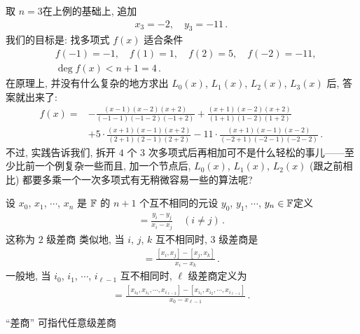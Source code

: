 \begin{example}
    取 $n = 3$\period 在上例的基础上, 追加
    \begin{align*}
        x_3 = -2, \quad y_3 = -11 \period
    \end{align*}
    我们的目标是: 找多项式 $f(x)$ 适合条件
    \begin{align*}
         & f(-1) = -1, \quad f(1) = 1, \quad f(2) = 5, \quad f(-2) = -11, \\
         & \deg f(x) < n + 1 = 4 \period
    \end{align*}
    在原理上, 并没有什么复杂的地方\period 求出 $L_0 (x)$, $L_1 (x)$, $L_2 (x)$, $L_3 (x)$ 后, 答案就出来了:
    \begin{align*}
        f(x)
        = {} & - \frac{(x-1)(x-2)(x+2)}{(-1-1)(-1-2)(-1+2)} + \frac{(x+1)(x-2)(x+2)}{(1+1)(1-2)(1+2)}                          \\
             & + 5 \cdot \frac{(x+1)(x-1)(x+2)}{(2+1)(2-1)(2+2)} - 11 \cdot \frac{(x+1)(x-1)(x-2)}{(-2+1)(-2-1)(-2-2)} \period
    \end{align*}
    不过, 实践告诉我们, 拆开 $4$ 个 $3$ 次多项式后再相加可不是什么轻松的事儿——至少比前一个例复杂一些\period 而且, 加一个节点后, $L_0 (x)$, $L_1 (x)$, $L_2 (x)$ (跟之前相比) 都要多乘一个一次多项式\period 有无稍微容易一些的算法呢?
\end{example}

\begin{definition}
    设 $x_0$, $x_1$, $\cdots$, $x_{n}$ 是 $\mathbb{F}$ 的 $n+1$ 个互不相同的元\period 设 $y_0$, $y_1$, $\cdots$, $y_{n} \in \mathbb{F}$\period 定义
    \begin{align*}
        [x_i, x_j] = \frac{y_i - y_j}{x_i - x_j} \quad (i \neq j)\period
    \end{align*}
    这称为 $2$ 级差商 \period 类似地, 当 $i$, $j$, $k$ 互不相同时, $3$ 级差商是
    \begin{align*}
        [x_i, x_j, x_k] = \frac{[x_i, x_j] - [x_j, x_k]}{x_i - x_k} \period
    \end{align*}
    一般地, 当 $i_0$, $i_1$, $\cdots$, $i_{\ell - 1}$ 互不相同时, $\ell$ 级差商定义为
    \begin{align*}
        [x_{i_0}, x_{i_1}, \cdots, x_{i_{\ell - 1}}] = \frac{[x_{i_0}, x_{i_1}, \cdots, x_{i_{\ell - 2}}] - [x_{i_1}, x_{i_2}, \cdots, x_{i_{\ell - 1}}]}{x_0 - x_{\ell - 1}} \period
    \end{align*}

    ``差商'' 可指代任意级差商\period
\end{definition}
